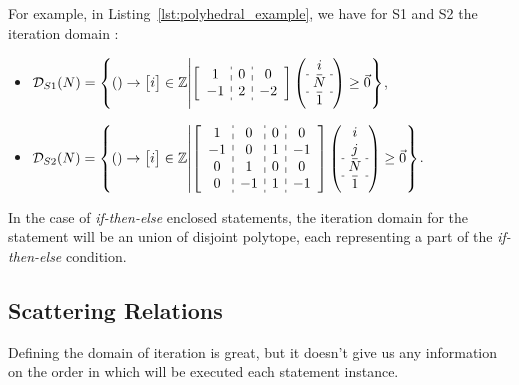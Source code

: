 \documentclass[paper=a4, fontsize=11.5pt]{scrartcl}
\numberwithin{equation}{section}        %
\numberwithin{figure}{section}          %
\numberwithin{table}{section}               %
\begin{document}
        For example, in Listing~\ref{lst:polyhedral_example}, we have for
        S1 and S2 the iteration domain :
        \begin{itemize}
            \item[]$ \mathcal{D}_{S1}(N) = \left\{() \to \begin{bmatrix}i\end{bmatrix} \in \mathbb{Z} \middle|
            \left[\begin{array}{c:c:c}
                    1 & 0 & 0 \\
                    -1 & 2 & -2
            \end{array}\right]
            \left(\begin{array}{c}
                    i \\ \hdashline
                    N \\ \hdashline
                    1 
            \end{array}\right)
            \geq \vec{0}
            \right\} $,
        
            \item[]$ \mathcal{D}_{S2}(N) = \left\{() \to \begin{bmatrix}i\end{bmatrix} \in \mathbb{Z} \middle|
            \left[\begin{array}{c:c:c:c}
                    1 & 0 & 0 & 0\\
                    -1 & 0 & 1 & -1\\
                    0 & 1 & 0 & 0\\
                    0 & -1 & 1 & -1
            \end{array}\right]
            \left(\begin{array}{c}
                    i \\
                    j \\ \hdashline
                    N \\ \hdashline
                    1 
            \end{array}\right)
            \geq \vec{0}
            \right\} $.
        \end{itemize}

        In the case of \textit{if-then-else} enclosed statements, the iteration domain
        for the statement will be an union of disjoint polytope, each representing a part
        of the \textit{if-then-else} condition.

    \subsection{Scattering Relations}
        Defining the domain of iteration is great, but it doesn't give us any information
        on the order in which will be executed each statement instance.
\end{document}
